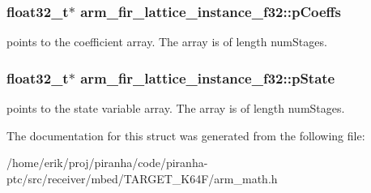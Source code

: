\subsubsection[{\texorpdfstring{p\+Coeffs}{pCoeffs}}]{\setlength{\rightskip}{0pt plus 5cm}float32\+\_\+t$\ast$ arm\+\_\+fir\+\_\+lattice\+\_\+instance\+\_\+f32\+::p\+Coeffs}\hypertarget{structarm__fir__lattice__instance__f32_a33bf5948c947f9ef80a99717cb0a0a43}{}\label{structarm__fir__lattice__instance__f32_a33bf5948c947f9ef80a99717cb0a0a43}
points to the coefficient array. The array is of length num\+Stages. 
\subsubsection[{\texorpdfstring{p\+State}{pState}}]{\setlength{\rightskip}{0pt plus 5cm}float32\+\_\+t$\ast$ arm\+\_\+fir\+\_\+lattice\+\_\+instance\+\_\+f32\+::p\+State}\hypertarget{structarm__fir__lattice__instance__f32_ae348884a1ba9b83fadccd5da640cbcaf}{}\label{structarm__fir__lattice__instance__f32_ae348884a1ba9b83fadccd5da640cbcaf}
points to the state variable array. The array is of length num\+Stages. 

The documentation for this struct was generated from the following file\+:\begin{DoxyCompactItemize}
\item 
/home/erik/proj/piranha/code/piranha-\/ptc/src/receiver/mbed/\+T\+A\+R\+G\+E\+T\+\_\+\+K64\+F/arm\+\_\+math.\+h\end{DoxyCompactItemize}
